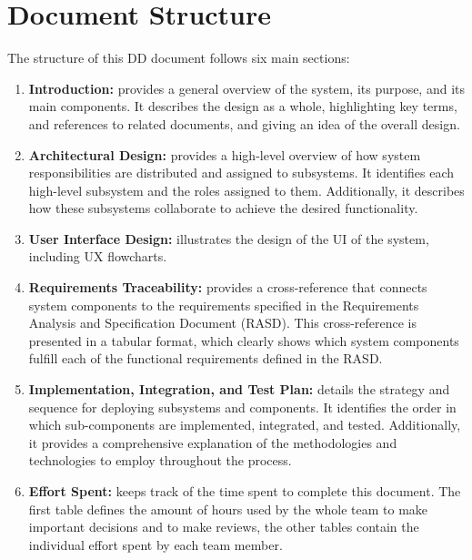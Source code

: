 \newpage

\section{Document Structure}
The structure of this DD document follows six main sections:
\begin{enumerate}
    \item \textbf{Introduction:}
          provides a general overview of the system, its purpose, and its main components. 
          It describes the design as a whole, highlighting key terms, and references to related documents, and giving an idea of the overall design.

    \item \textbf{Architectural Design:}
          provides a high-level overview of how system responsibilities are distributed and assigned to subsystems. 
          It identifies each high-level subsystem and the roles assigned to them. 
          Additionally, it describes how these subsystems collaborate to achieve the desired functionality.
          
    \item \textbf{User Interface Design:}
          illustrates the design of the UI of the system, including UX flowcharts.
    
    \item \textbf{Requirements Traceability:}
          provides a cross-reference that connects system components to the requirements specified in the Requirements Analysis and Specification Document (RASD). 
          This cross-reference is presented in a tabular format, which clearly shows which system components fulfill each of the functional requirements defined in the RASD.

    \item \textbf{Implementation, Integration, and Test Plan:}   
          details the strategy and sequence for deploying subsystems and components. 
          It identifies the order in which sub-components are implemented, integrated, and tested. Additionally, it provides a comprehensive explanation of the methodologies and technologies to employ throughout the process.

    \item \textbf{Effort Spent:}
          keeps track of the time spent to complete this document.
          The first table defines the amount of hours used by the whole team to make important decisions and to make reviews,
          the other tables contain the individual effort spent by each team member.
\end{enumerate}